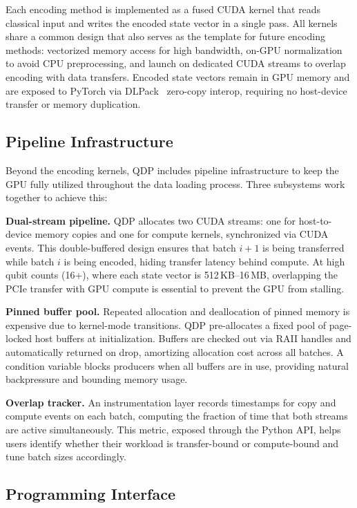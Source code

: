 \documentclass[sigconf, nonacm]{acmart}
\begin{document}
Each encoding method is implemented as a fused CUDA kernel that reads classical input and writes the encoded state vector in a single pass.
All kernels share a common design that also serves as the template for future encoding methods: vectorized memory access for high bandwidth, on-GPU normalization to avoid CPU preprocessing, and launch on dedicated CUDA streams to overlap encoding with data transfers.
Encoded state vectors remain in GPU memory and are exposed to PyTorch via DLPack~\cite{dlpack} zero-copy interop, requiring no host-device transfer or memory duplication.

\subsection{Pipeline Infrastructure}

Beyond the encoding kernels, QDP includes pipeline infrastructure to keep the GPU fully utilized throughout the data loading process.
Three subsystems work together to achieve this:

\textbf{Dual-stream pipeline.}
QDP allocates two CUDA streams: one for host-to-device memory copies and one for compute kernels, synchronized via CUDA events.
This double-buffered design ensures that batch $i{+}1$ is being transferred while batch $i$ is being encoded, hiding transfer latency behind compute.
At high qubit counts (16+), where each state vector is 512\,KB--16\,MB, overlapping the PCIe transfer with GPU compute is essential to prevent the GPU from stalling.

\textbf{Pinned buffer pool.}
Repeated allocation and deallocation of pinned memory is expensive due to kernel-mode transitions.
QDP pre-allocates a fixed pool of page-locked host buffers at initialization.
Buffers are checked out via RAII handles and automatically returned on drop, amortizing allocation cost across all batches.
A condition variable blocks producers when all buffers are in use, providing natural backpressure and bounding memory usage.

\textbf{Overlap tracker.}
An instrumentation layer records timestamps for copy and compute events on each batch, computing the fraction of time that both streams are active simultaneously.
This metric, exposed through the Python API, helps users identify whether their workload is transfer-bound or compute-bound and tune batch sizes accordingly.

\subsection{Programming Interface}
\end{document}
